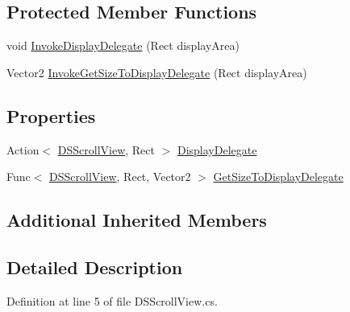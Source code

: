 \subsection*{Protected Member Functions}
\begin{DoxyCompactItemize}
\item 
void \hyperlink{class_d_s_scroll_view_ac8b5fbd529a99ed5f4d504fc233206d3}{Invoke\+Display\+Delegate} (Rect display\+Area)
\item 
Vector2 \hyperlink{class_d_s_scroll_view_a67f0527a2ac687f10dde49ada2c045d4}{Invoke\+Get\+Size\+To\+Display\+Delegate} (Rect display\+Area)
\end{DoxyCompactItemize}
\subsection*{Properties}
\begin{DoxyCompactItemize}
\item 
Action$<$ \hyperlink{class_d_s_scroll_view}{D\+S\+Scroll\+View}, Rect $>$ \hyperlink{class_d_s_scroll_view_a8ab2159844134c054149b399d98adc59}{Display\+Delegate}
\item 
Func$<$ \hyperlink{class_d_s_scroll_view}{D\+S\+Scroll\+View}, Rect, Vector2 $>$ \hyperlink{class_d_s_scroll_view_ad373079c51845a6cf4fc9d0bc4db6abe}{Get\+Size\+To\+Display\+Delegate}
\end{DoxyCompactItemize}
\subsection*{Additional Inherited Members}


\subsection{Detailed Description}


Definition at line 5 of file D\+S\+Scroll\+View.\+cs.




